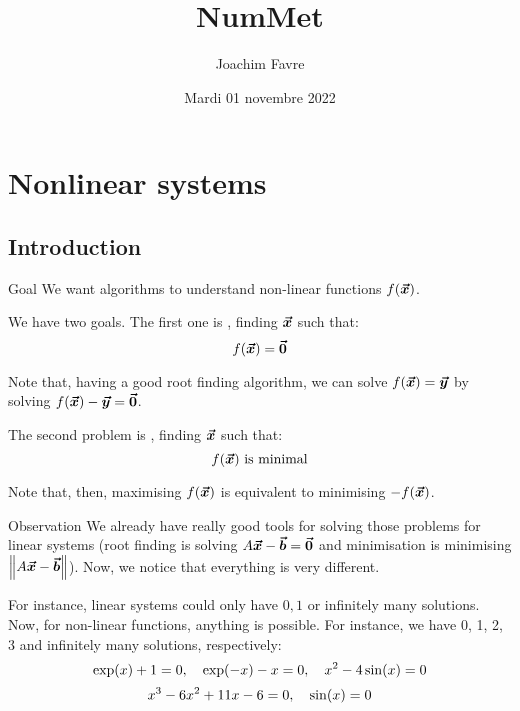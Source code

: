 \documentclass[a4paper]{article}
\title{NumMet}
\author{Joachim Favre}
\date{Mardi 01 novembre 2022}
\begin{document}
\maketitle


\section{Nonlinear systems}
\subsection{Introduction}

\begin{parag}{Goal}
    We want algorithms to understand non-linear functions $f\left(\bvec{x}\right)$.

    We have two goals. The first one is , finding $\bm{\protect\vec{x}}$ such that:
    \[f\left(\bvec{x}\right) = \bvec{0}\]

    Note that, having a good root finding algorithm, we can solve $f\left(\bvec{x}\right) = \bvec{y}$ by solving $f\left(\bvec{x}\right) - \bvec{y} = \bvec{0}$.

    The second problem is , finding $\bm{\protect\vec{x}}$ such that: 
    \[f\left(\bvec{x}\right) \text{ is minimal}\]

    Note that, then, maximising $f\left(\bvec{x}\right)$ is equivalent to minimising $-f\left(\bvec{x}\right)$.
    
    \begin{subparag}{Observation}
        We already have really good tools for solving those problems for linear systems (root finding is solving $A \bm{\protect\vec{x}} - \bm{\protect\vec{b}} = \bm{\protect\vec{0}}$ and minimisation is minimising $\left\|A \bvec{x} - \bvec{b}\right\|$). Now, we notice that everything is very different.
        
        For instance, linear systems could only have $0, 1$ or infinitely many solutions. Now, for non-linear functions, anything is possible. For instance, we have 0, 1, 2, 3 and infinitely many solutions, respectively:
        \[\exp\left(x\right) + 1 = 0, \mathspace \exp\left(-x\right) - x = 0, \mathspace x^2 - 4\sin\left(x\right) = 0\]
        \[x^3 - 6x^2 + 11x - 6 = 0, \mathspace \sin\left(x\right) = 0\]
    \end{subparag}

\end{parag}
\end{document}
